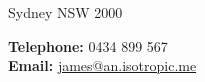 
\vspace{-1in}
{\huge \name}


\bigskip

\begin{minipage}[t]{0.672\textwidth}
Sydney NSW 2000
\end{minipage}
\begin{minipage}[t]{0.48\textwidth}
\textbf{Telephone:} 0434 899 567\\
\textbf{Email:} \href{mailto:james@an.isotropic.me}{james@an.isotropic.me} \\
\end{minipage}
